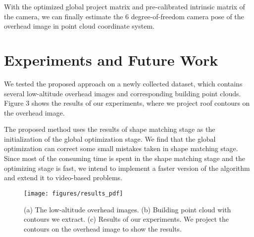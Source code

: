 With the optimized global project matrix and pre-calibrated intrinsic matrix of the camera, we can finally estimate the 6 degree-of-freedom camera pose of the overhead image in point cloud coordinate system.
\section{Experiments and Future Work}
We tested the proposed approach on a newly collected dataset, which contains several low-altitude overhead images and corresponding building point clouds. Figure 3 shows the results of our experiments, where we project roof contours on the overhead image. 

The proposed method uses the results of shape matching stage as the initialization of the global optimization stage. We find that the global optimization can correct some small mistakes taken in shape matching stage. 
Since most of the consuming time is spent in the shape matching stage and the optimizing stage is fast, we intend to implement a faster version of the algorithm and extend it to video-based problems. 

\begin{figure}[b]
	\centering
	\texttt{[image: figures/results\_pdf]}
	\caption{(a) The low-altitude overhead images. (b) Building point cloud with contours we extract. (c) Results of our experiments. We project the contours on the overhead image to show the results.}
	\label{fig:comparison}
\end{figure}
